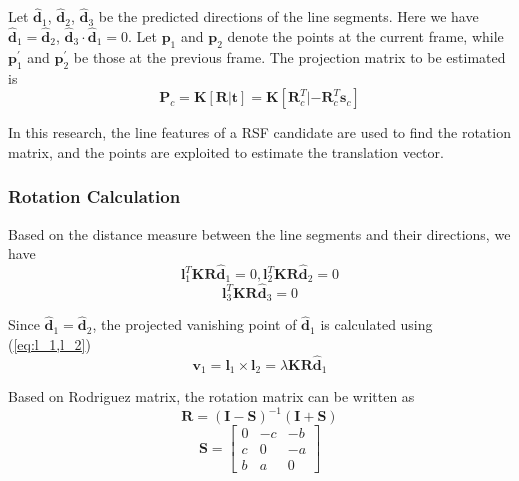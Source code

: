 \documentclass[letterpaper, 10 pt, conference]{ieeeconf}  %
\begin{document}
Let $\hat{\mathbf{d}}_1$, $\hat{\mathbf{d}}_2$, $\hat{\mathbf{d}}_3$ be the predicted directions of the line segments. Here we have $\hat{\mathbf{d}}_1=\hat{\mathbf{d}}_2$, $\hat{\mathbf{d}}_3\cdot\hat{\mathbf{d}}_1=0$. Let $\mathbf{p}_1$ and $\mathbf{p}_2$ denote the points at the current frame, while $\mathbf{p}_1^\prime$ and $\mathbf{p}_2^\prime$ be those at the previous frame.
The projection matrix to be estimated is
\begin{equation}
\mathbf{P}_c = \mathbf{K}[\mathbf{R}|\mathbf{t}] = \mathbf{K}[\mathbf{R}_c^T|-\mathbf{R}_c^T\mathbf{s}_c]
\end{equation}

In this research, the line features of a RSF candidate are used to find the rotation matrix, and the points are exploited to estimate the translation vector.

\subsubsection{Rotation Calculation}
Based on the distance measure between the line segments and their directions, we have
\begin{equation}
\mathbf{l}_1^T\mathbf{K}\mathbf{R}\hat{\mathbf{d}}_1=0, \mathbf{l}_2^T\mathbf{K}\mathbf{R}\hat{\mathbf{d}}_2=0
\label{eq:l_1,l_2}
\end{equation}
\begin{equation}
\mathbf{l}_3^T\mathbf{K}\mathbf{R}\hat{\mathbf{d}}_3=0
\label{eq:l_3}
\end{equation}

Since $\hat{\mathbf{d}}_1=\hat{\mathbf{d}}_2$, the projected vanishing point of $\hat{\mathbf{d}}_1$ is calculated using (\ref{eq:l_1,l_2})
\begin{equation}
\mathbf{v}_1 = \mathbf{l}_1\times \mathbf{l}_2 =  \lambda \mathbf{K}\mathbf{R}\hat{\mathbf{d}}_1
\label{eq:vp}
\end{equation}

Based on Rodriguez matrix, the rotation matrix can be written as
\begin{equation}
\mathbf{R}=\left(\mathbf{I}-\mathbf{S}\right)^{-1}\left(\mathbf{I}+\mathbf{S}\right)
\label{eq:Rodriguez_R}
\end{equation}
\begin{equation}
\mathbf{S}=\begin{bmatrix}      0 & -c & -b \\
                                c & 0 & -a \\
                                b & a & 0
                    \end{bmatrix}
\label{eq:Rodriguez_S}
\end{equation}
\end{document}
